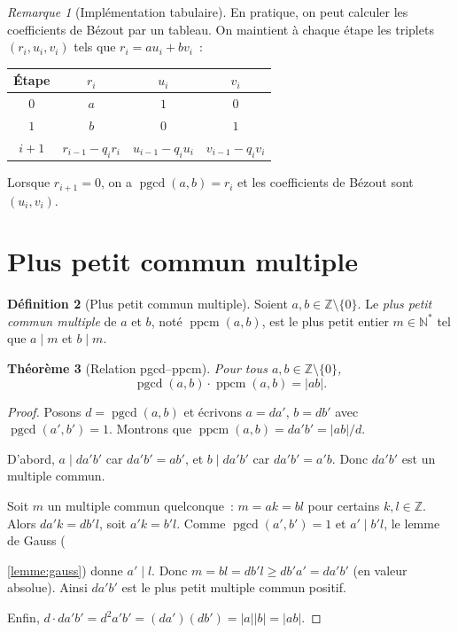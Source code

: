 \documentclass[12pt,a4paper,openany]{book}
\theoremstyle{definition}
\newtheorem{definition}{Définition}[chapter]
\theoremstyle{plain}
\newtheorem{theoreme}[definition]{Théorème}
\theoremstyle{remark}
\newtheorem{remarque}[definition]{Remarque}
\newcommand{\N}{\mathbb{N}}
\newcommand{\Z}{\mathbb{Z}}
\newcommand{\abs}[1]{\left|#1\right|}
\DeclareMathOperator{\pgcd}{pgcd}
\DeclareMathOperator{\ppcm}{ppcm}
\begin{document}
\begin{remarque}[Implémentation tabulaire]
\label{rem:bezout:tableau}
En pratique, on peut calculer les coefficients de Bézout par un tableau. On maintient
à chaque étape les triplets $(r_i, u_i, v_i)$ tels que $r_i = au_i + bv_i$~:
\begin{center}
\begin{tabular}{cccc}
\toprule
Étape & $r_i$ & $u_i$ & $v_i$ \\
\midrule
$0$ & $a$ & $1$ & $0$ \\
$1$ & $b$ & $0$ & $1$ \\
$i+1$ & $r_{i-1} - q_i r_i$ & $u_{i-1} - q_i u_i$ & $v_{i-1} - q_i v_i$ \\
\bottomrule
\end{tabular}
\end{center}
Lorsque $r_{i+1} = 0$, on a $\pgcd(a,b) = r_i$ et les coefficients de Bézout sont
$(u_i, v_i)$.
\end{remarque}

\section{Plus petit commun multiple}
\label{sec:ch1:ppcm}


\begin{definition}[Plus petit commun multiple]
\label{def:ppcm}
Soient $a, b \in \Z \setminus \{0\}$. Le \emph{plus petit commun multiple} de $a$
et $b$, noté $\ppcm(a,b)$, est le plus petit entier $m \in \N^*$ tel que $a \mid m$
et $b \mid m$.
\end{definition}

\begin{theoreme}[Relation pgcd--ppcm]
\label{thm:pgcd_ppcm}
Pour tous $a, b \in \Z \setminus \{0\}$,
\[
  \pgcd(a,b) \cdot \ppcm(a,b) = \abs{ab}.
\]
\end{theoreme}

\begin{proof}
Posons $d = \pgcd(a,b)$ et écrivons $a = da'$, $b = db'$ avec $\pgcd(a',b') = 1$.
Montrons que $\ppcm(a,b) = da'b' = \abs{ab}/d$.

D'abord, $a \mid da'b'$ car $da'b' = ab'$, et $b \mid da'b'$ car $da'b' = a'b$.
Donc $da'b'$ est un multiple commun.

Soit $m$ un multiple commun quelconque~: $m = ak = bl$ pour certains $k, l \in \Z$.
Alors $da'k = db'l$, soit $a'k = b'l$. Comme $\pgcd(a',b') = 1$ et $a' \mid b'l$,
le lemme de Gauss (





\ref{lemme:gauss}) donne $a' \mid l$. Donc
$m = bl = db'l \geq db'a' = da'b'$ (en valeur absolue). Ainsi $da'b'$ est le plus
petit multiple commun positif.

Enfin, $d \cdot da'b' = d^2 a'b' = (da')(db') = \abs{a}\abs{b} = \abs{ab}$.
\end{proof}
\end{document}
